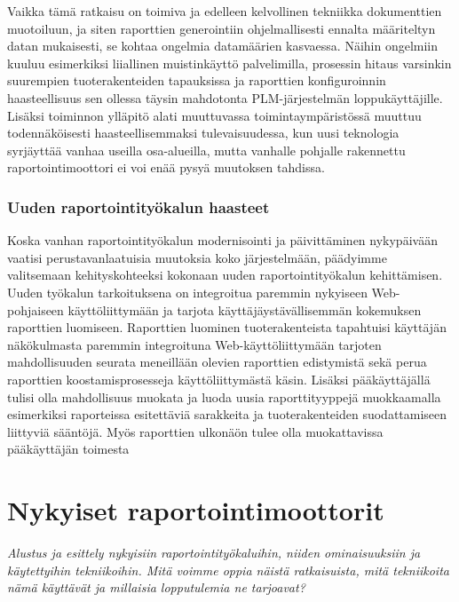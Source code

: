 Vaikka tämä ratkaisu on toimiva ja edelleen kelvollinen tekniikka dokumenttien muotoiluun, ja siten raporttien generointiin ohjelmallisesti ennalta määriteltyn datan mukaisesti, se kohtaa ongelmia datamäärien kasvaessa. Näihin ongelmiin kuuluu esimerkiksi liiallinen muistinkäyttö palvelimilla, prosessin hitaus varsinkin suurempien tuoterakenteiden tapauksissa ja raporttien konfiguroinnin haasteellisuus sen ollessa täysin mahdotonta PLM-järjestelmän loppukäyttäjille. Lisäksi toiminnon ylläpitö alati muuttuvassa toimintaympäristössä muuttuu todennäköisesti haasteellisemmaksi tulevaisuudessa, kun uusi teknologia syrjäyttää vanhaa useilla osa-alueilla, mutta vanhalle pohjalle rakennettu raportointimoottori ei voi enää pysyä muutoksen tahdissa.

\subsubsection{Uuden raportointityökalun haasteet}

Koska vanhan raportointityökalun modernisointi ja päivittäminen nykypäivään vaatisi perustavanlaatuisia muutoksia koko järjestelmään, päädyimme valitsemaan kehityskohteeksi kokonaan uuden raportointityökalun kehittämisen. Uuden työkalun tarkoituksena on integroitua paremmin nykyiseen Web-pohjaiseen käyttöliittymään ja tarjota käyttäjäystävällisemmän kokemuksen raporttien luomiseen. Raporttien luominen tuoterakenteista tapahtuisi käyttäjän näkökulmasta paremmin integroituna Web-käyttöliittymään tarjoten mahdollisuuden seurata meneillään olevien raporttien edistymistä sekä perua raporttien koostamisprosesseja käyttöliittymästä käsin. Lisäksi pääkäyttäjällä tulisi olla mahdollisuus muokata ja luoda uusia raporttityyppejä muokkaamalla esimerkiksi raporteissa esitettäviä sarakkeita ja tuoterakenteiden suodattamiseen liittyviä sääntöjä. Myös raporttien ulkonäön tulee olla muokattavissa pääkäyttäjän toimesta

\section{Nykyiset raportointimoottorit}

\textit{Alustus ja esittely nykyisiin raportointityökaluihin, niiden ominaisuuksiin ja käytettyihin tekniikoihin. Mitä voimme oppia näistä ratkaisuista, mitä tekniikoita nämä käyttävät ja millaisia lopputulemia ne tarjoavat?}
